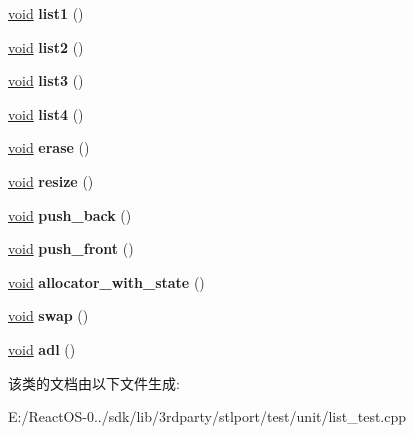 \begin{DoxyCompactItemize}
\item 
\mbox{\label{class_list_test_a683467d4353ddf4be112b881c5b0695d}} 
\hyperlink{interfacevoid}{void} {\bfseries list1} ()
\item 
\mbox{\label{class_list_test_a9548fad8181c6761ab75b40a02ecc3ca}} 
\hyperlink{interfacevoid}{void} {\bfseries list2} ()
\item 
\mbox{\label{class_list_test_ac7e1bdebc4d818d0ce58efbdd05db66c}} 
\hyperlink{interfacevoid}{void} {\bfseries list3} ()
\item 
\mbox{\label{class_list_test_a2ee575c40fe3d8e802d30fa766fc3d1a}} 
\hyperlink{interfacevoid}{void} {\bfseries list4} ()
\item 
\mbox{\label{class_list_test_a2687a594760c376c53182a293514b6fc}} 
\hyperlink{interfacevoid}{void} {\bfseries erase} ()
\item 
\mbox{\label{class_list_test_a7e0900d8510df16496cdf9676a335774}} 
\hyperlink{interfacevoid}{void} {\bfseries resize} ()
\item 
\mbox{\label{class_list_test_aece4dfcae23cecd62ff07660f486af4b}} 
\hyperlink{interfacevoid}{void} {\bfseries push\+\_\+back} ()
\item 
\mbox{\label{class_list_test_ab329ddf8bafabe7be4e8809812efa7ad}} 
\hyperlink{interfacevoid}{void} {\bfseries push\+\_\+front} ()
\item 
\mbox{\label{class_list_test_ad654cbcfbd6126561e85c7ec9bb31cde}} 
\hyperlink{interfacevoid}{void} {\bfseries allocator\+\_\+with\+\_\+state} ()
\item 
\mbox{\label{class_list_test_af922cad3d9c4f5500456579fc14e4c22}} 
\hyperlink{interfacevoid}{void} {\bfseries swap} ()
\item 
\mbox{\label{class_list_test_af25b1d652cd86e6d9a367a8ad8e62f0d}} 
\hyperlink{interfacevoid}{void} {\bfseries adl} ()
\end{DoxyCompactItemize}


该类的文档由以下文件生成\+:\begin{DoxyCompactItemize}
\item 
E\+:/\+React\+O\+S-\/0../sdk/lib/3rdparty/stlport/test/unit/list\+\_\+test.\+cpp\end{DoxyCompactItemize}
